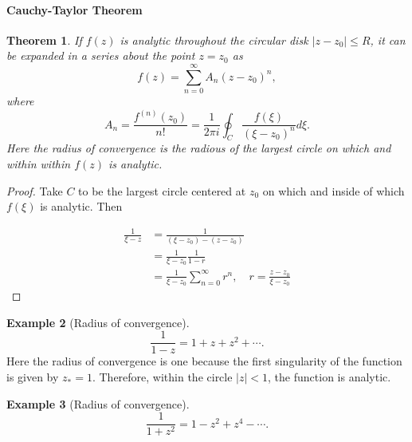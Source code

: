 \documentclass[12pt]{article}
\newcommand{\abs}[1]{ \left| #1 \right| }
\newtheorem{thm}{Theorem}[section]
\theoremstyle{definition}
\newtheorem{exmp}[thm]{Example}
\theoremstyle{remark}
\numberwithin{equation}{section}
\begin{document}
\paragraph{Cauchy-Taylor Theorem}%
\label{par:cauchy_taylor_theorem}


\begin{thm}
  If $f(z)$ is analytic throughout the circular disk $\abs{z-z_0}\leq R$, it can be expanded in a series about the point $z=z_0$ as
  \begin{equation}
    f(z) = \sum_{n=0}^\infty A_n(z-z_0)^n,
  \end{equation}
  where 
  \begin{equation}
  A_n = \frac{f^{(n)}(z_0)}{n!} = \frac{1}{2\pi i} \oint_C \frac{f(\xi)}{(\xi - z_0)^n} d\xi.
  \end{equation}
  Here the radius of convergence is the radious of the largest circle on which and within within $f(z)$ is analytic.
\end{thm}
\begin{proof}
  Take $C$ to be the largest circle centered at $z_0$ on which and inside of which $f(\xi)$ is analytic. Then

  \begin{align}
    \frac{1}{\xi - z} &= \frac{1}{(\xi - z_0) - (z - z_0)} \\
                      &= \frac{1}{\xi - z_0} \frac{1}{1-r}\\
                      &= \frac{1}{\xi - z_0}\sum_{n=0}^\infty r^n, \quad r = \frac{z - z_0}{\xi - z_0}
  \end{align}
\end{proof}


\begin{exmp}[Radius of convergence]
\begin{equation}
  \frac{1}{1-z} = 1 + z + z^2 + \cdots.
\end{equation}
Here the radius of convergence is one because the first singularity of the function is given by $z_* = 1$. Therefore, within the circle $\abs{z}<1$, the function is analytic.
\end{exmp}

\begin{exmp}[Radius of convergence]
\begin{equation}
  \frac{1}{1+z^2} = 1 - z^2 + z^4 - \cdots.
\end{equation}
\end{exmp}
\end{document}
